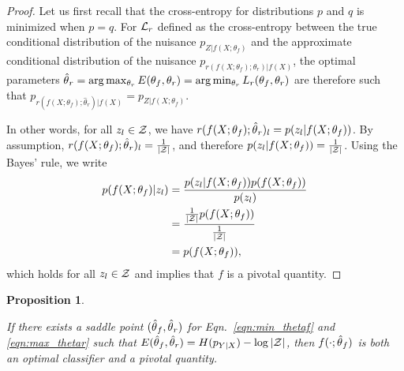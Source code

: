 \documentclass{article}
\theoremstyle{plain}
\newtheorem{proposition}[theorem]{Proposition}
\begin{document}
\begin{proof}

Let us first recall that the cross-entropy for distributions $p$ and $q$ is
minimized when $p=q$. For ${\cal L}_r$ defined as the cross-entropy between the
true conditional distribution of the nuisance $p_{Z|f(X;\theta_f)}$ and
the approximate conditional distribution of the nuisance
$p_{r(f(X;\theta_f);\theta_r)|f(X)}$, the optimal parameters $\smash{\hat\theta}_r =
\arg \max_{\theta_r} E(\theta_f, \theta_r) = \arg \min_{\theta_r} L_r(\theta_f,
\theta_r)$ are therefore such that $p_{r(f(X;\theta_f);\hat\theta_r)|f(X)} = p_{Z|f(X;\theta_f)}$.

In other words, for all $z_l \in {\cal Z}$, we have $r(f(X;\theta_f);\smash{\hat\theta}_r)_l = p(z_l|f(X;\theta_f))$.
By assumption, $r(f(X;\theta_f);\smash{\hat\theta}_r)_l = \frac{1}{|{\cal Z}|}$,
and therefore $p(z_l|f(X;\theta_f)) = \frac{1}{|{\cal Z}|}$.
Using the Bayes' rule, we write
\begin{align*}
    p(f(X;\theta_f)|z_l) &= \frac{ p(z_l|f(X;\theta_f)) p(f(X;\theta_f)) } { p(z_l)} \\
                         &= \frac{ \tfrac{1}{|{\cal Z}|} p(f(X;\theta_f)) } { \tfrac{1}{|{\cal Z}|} } \\
                         &= p(f(X;\theta_f)),
\end{align*}
which holds for all $z_l \in {\cal Z}$ and implies that $f$ is a pivotal quantity.
\end{proof}

\begin{proposition}\label{prop:2}

If there exists a saddle point $(\smash{\hat\theta}_f, \smash{\hat\theta}_r)$
for Eqn.~\ref{eqn:min_thetaf} and \ref{eqn:max_thetar} such that
$E(\hat\theta_f, \hat\theta_r) = H(p_{Y|X}) - \log |{\cal Z}|$, then
$f(\cdot;\smash{\hat\theta}_f)$ is both an optimal classifier  and a pivotal quantity.

\end{proposition}
\end{document}
